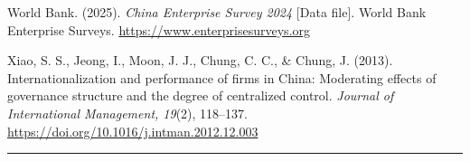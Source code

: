 \documentclass[12pt,a4paper]{article}
\begin{document}
World Bank. (2025). \emph{China Enterprise Survey 2024} {[}Data file{]}.
World Bank Enterprise Surveys. \url{https://www.enterprisesurveys.org}

Xiao, S. S., Jeong, I., Moon, J. J., Chung, C. C., \& Chung, J. (2013).
Internationalization and performance of firms in China: Moderating
effects of governance structure and the degree of centralized control.
\emph{Journal of International Management, 19}(2), 118--137.
\url{https://doi.org/10.1016/j.intman.2012.12.003}

\begin{center}\rule{0.5\linewidth}{0.5pt}\end{center}
\end{document}
